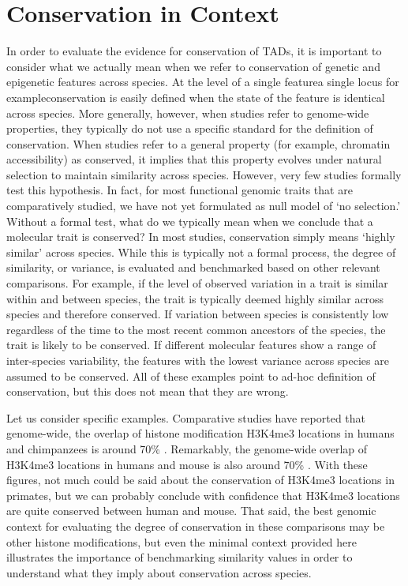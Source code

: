 \section{Conservation in Context}
In order to evaluate the evidence for conservation of TADs, it is important to consider what we actually mean when we refer to conservation of genetic and epigenetic features across species. At the level of a single feature{\textemdash}a single locus for example{\textemdash}conservation is easily defined when the state of the feature is identical across species. More generally, however, when studies refer to genome-wide properties, they typically do not use a specific standard for the definition of conservation. When studies refer to a general property (for example, chromatin accessibility) as conserved, it implies that this property evolves under natural selection to maintain similarity across species. However, very few studies formally test this hypothesis. In fact, for most functional genomic traits that are comparatively studied, we have not yet formulated as null model of `no selection.' 
Without a formal test, what do we typically mean when we conclude that a molecular trait is conserved? In most studies, conservation simply means `highly similar' across species. While this is typically not a formal process, the degree of similarity, or variance, is evaluated and benchmarked based on other relevant comparisons. For example, if the level of observed variation in a trait is similar within and between species, the trait is typically deemed highly similar across species and therefore conserved. If variation between species is consistently low regardless of the time to the most recent common ancestors of the species, the trait is likely to be conserved. If different molecular features show a range of inter-species variability, the features with the lowest variance across species are assumed to be conserved. All of these examples point to ad-hoc definition of conservation, but this does not mean that they are wrong.

Let us consider specific examples. Comparative studies have reported that genome-wide, the overlap of histone modification H3K4me3 locations in humans and chimpanzees is around 70\% \cite{Cain.2011}. Remarkably, the genome-wide overlap of H3K4me3 locations in humans and mouse is also around 70\% \cite{Woo.2012}. With these figures, not much could be said about the conservation of H3K4me3 locations in primates, but we can probably conclude with confidence that H3K4me3 locations are quite conserved between human and mouse. That said, the best genomic context for evaluating the degree of conservation in these comparisons may be other histone modifications, but even the minimal context provided here illustrates the importance of benchmarking similarity values in order to understand what they imply about conservation across species. 

